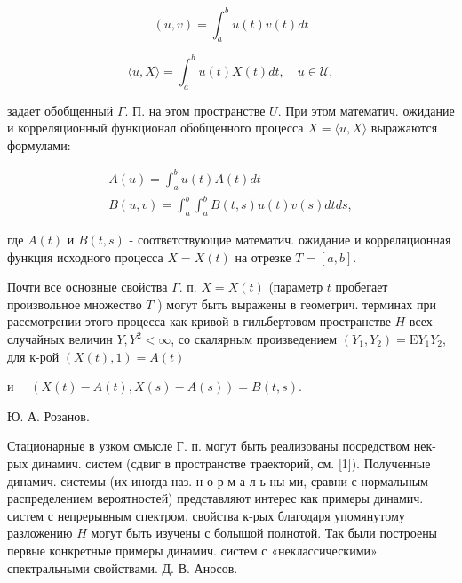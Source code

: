 \documentclass[10pt]{article}
\begin{document}
\[

(u, v)=\int_{a}^{b} u(t) v(t) d t

\]



\[

\langle u, X\rangle=\int_{a}^{b} u(t) X(t) d t, \quad u \in \mathcal{U},

\]



задает обобщенный $\Gamma$. П. на этом пространстве $U$. При этом математич. ожидание и корреляционный функционал обобщенного процесса $X=\langle u, X\rangle$ выражаются формулами:



\[

\begin{gathered}

A(u)=\int_{a}^{b} u(t) A(t) d t \\

B(u, v)=\int_{a}^{b} \int_{a}^{b} B(t, s) u(t) v(s) d t d s,

\end{gathered}

\]



где $A(t)$ и $B(t, s)$ - соответствующие математич. ожидание и корреляционная функция исходного процесса $X=X(t)$ на отрезке $T=[a, b]$.



Почти все основные свойства $\Gamma$. п. $X=X(t)$ (параметр $t$ пробегает произвольное множество $T$ ) могут быть выражены в геометрич. терминах при рассмотрении этого процесса как кривой в гильбертовом пространстве $H$ всех случайных величин $Y, Y^{2}<\infty$, со скалярным произведением $\left(Y_{1}, Y_{2}\right)=\mathrm{E} Y_{1} Y_{2}$, для к-рой $(X(t), 1)=A(t)$

и $\quad(X(t)-A(t), X(s)-A(s))=B(t, s)$.



Ю. А. Розанов.



Стационарные в узком смысле Г. п. могут быть реализованы посредством нек-рых динамич. систем (сдвиг в пространстве траекторий, см. [1]). Полученные динамич. системы (их иногда наз. н о р м а л ь ны ми, сравни с нормальным распределением вероятностей) представляют интерес как примеры динамич. систем с непрерывным спектром, свойства к-рых благодаря упомянутому разложению $H$ могут быть изучены с болышой полнотой. Так были построены первые конкретные примеры динамич. систем с «неклассическими» спектральными свойствами. Д. В. Аносов.
\end{document}
